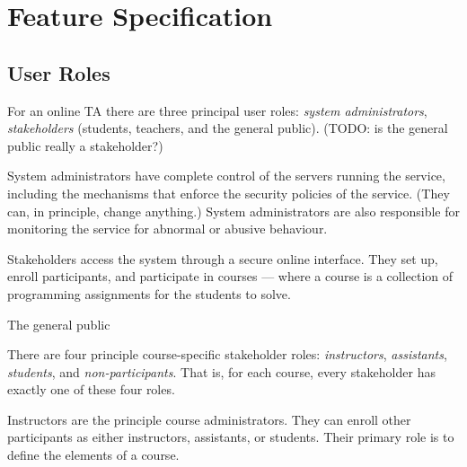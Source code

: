 
\chapter{Feature Specification}



\section{User Roles}


For an online TA there are three principal user roles: \emph{system
administrators}, \emph{stakeholders} (students, teachers, and the general
public). (TODO: is the general public really a stakeholder?) 



System administrators have complete control of the servers running the service,
including the mechanisms that enforce the security policies of the service.
(They can, in principle, change anything.) System administrators are also
responsible for monitoring the service for abnormal or abusive behaviour.


Stakeholders access the system through a secure online interface. They set up,
enroll participants, and participate in courses --- where a course is a
collection of programming assignments for the students to solve.

The general public


There are four principle course-specific stakeholder roles: \emph{instructors},
\emph{assistants}, \emph{students}, and \emph{non-participants}. That is, for
each course, every stakeholder has exactly one of these four roles.

Instructors are the principle course administrators. They can enroll other
participants as either instructors, assistants, or students. Their primary role
is to define the elements of a course.

